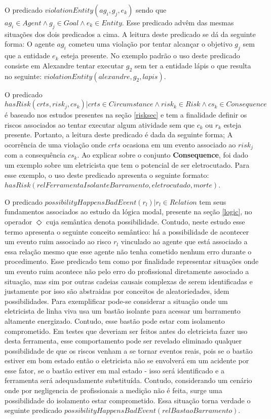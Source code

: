 O predicado $ violationEntity(ag_i,g_j,e_k) $ sendo que $ag_i \in Agent \wedge g_j \in Goal \wedge e_k \in Entity$. Esse predicado advêm das mesmas situações dos dois predicados a cima. A leitura deste predicado se dá da seguinte forma: O agente $ag_i$ cometeu uma violação por tentar alcançar o objetivo $g_j$ sem que a entidade $e_k$ esteja presente. No exemplo padrão o uso deste predicado consiste em Alexandre tentar executar $g_2$ sem ter a entidade lápis o que resulta no seguinte: $violationEntity(alexandre, g_2, lapis)$.

O predicado $ hasRisk(crts, risk_j, cs_k) | crts \in Circumstance \wedge  risk_k \in Risk \wedge cs_k \in Consequence $ é baseado nos estudos presentes na seção \ref{risksec} e tem a finalidade definir os riscos associados ao tentar executar algum atividade sem que $c_k$ ou $r_k$ esteja presente. Portanto, a leitura deste predicado é dada da seguinte forma; A ocorrência de uma violação onde $crts$ ocasiona em um evento associado ao $risk_j$ com a consequência $cs_k$. Ao explicar sobre o conjunto \textbf{Consequence}, foi dado um exemplo sobre um eletricista que tem o potencial de ser eletrocutado. Para esse exemplo, o uso deste predicado apresenta o seguinte formato: $hasRisk(relFerramentaIsolanteBarramento, eletrocutado, morte)$.

O predicado $possibilityHappensBadEvent(r_l) | r_l \in Relation $ tem seus fundamentos associados ao estudo da lógica modal, presente na seção \ref{logic}, no operador $\Diamond$ cuja semântica denota possibilidade. Contudo, neste estudo esse termo apresenta o seguinte conceito semântico: há a possibilidade de acontecer um evento ruim associado ao risco $r_l$ vinculado ao agente que está associado a essa relação mesmo que esse agente não tenha cometido nenhum erro durante o procedimento. Esse predicado tem como por finalidade representar situações onde um evento ruim acontece não pelo erro do profissional diretamente associado a situação, mas sim por outras cadeias causais complexas de serem identificadas e justamente por isso são abstraidas por conceitos de aleatoriedades, idem possibilidades. Para exemplificar pode-se considerar a situação onde um eletricista de linha viva usa um bastão isolante para acessar um barramento altamente energizado. Contudo, esse bastão pode estar com isolamento comprometido. Em testes que deveriam ser feitos antes do eletricista fazer uso desta ferramenta, esse comportamento pode ser revelado eliminado qualquer possibilidade de que os riscos venham a se tornar eventos reais, pois se o bastão estiver em bom estado então o eletricista não se envolverá em um acidente por esse fator, se o bastão estiver em mal estado - isso será identificado e a ferramenta será adequadamente substituída. Contudo, considerando um cenário onde por negligencia de profissionais a medição não é feita, surge uma possibilidade do isolamento estar comprometido. Essa situação torna verdade o seguinte predicado $possibilityHappensBadEvent(relBastaoBarramento)$.

